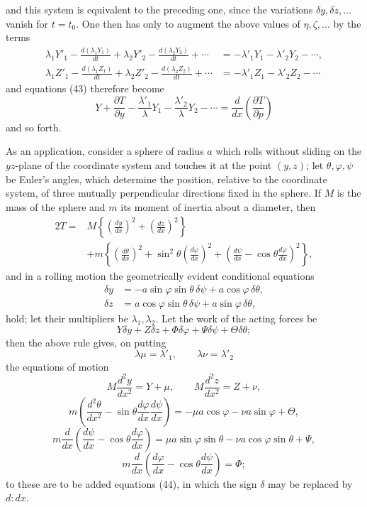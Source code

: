\documentclass[11pt,a4paper,leqno]{article}
\begin{document}
and this system is equivalent to the preceding one, since the variations $\delta y,\delta z,\ldots$ vanish for $t=t_0$. One then has only to augment the above values of $\eta,\zeta,\ldots$ by the terms
\[
\begin{aligned}
\lambda_1Y'_1-\frac{d(\lambda_1Y_1)}{dt}
+\lambda_2Y'_2-\frac{d(\lambda_2Y_2)}{dt}+\cdots
&=-\lambda'_1Y_1-\lambda'_2Y_2-\cdots,\\
\lambda_1Z'_1-\frac{d(\lambda_1Z_1)}{dt}
+\lambda_2Z'_2-\frac{d(\lambda_2Z_2)}{dt}+\cdots
&=-\lambda'_1Z_1-\lambda'_2Z_2-\cdots
\end{aligned}
\]
and equations (43) therefore become
\[
Y+\frac{\partial T}{\partial y}
-\frac{\lambda'_1}{\lambda}Y_1
-\frac{\lambda'_2}{\lambda}Y_2-\cdots
=\frac{d}{dx}\left(\frac{\partial T}{\partial p}\right)
\]
and so forth.

As an application, consider a sphere of radius $a$ which rolls without sliding on the $yz$-plane of the coordinate system and touches it at the point $(y,z)$; let $\theta,\varphi,\psi$ be Euler's angles, which determine the position, relative to the coordinate system, of three mutually perpendicular directions fixed in the sphere. If $M$ is the mass of the sphere and $m$ its moment of inertia about a diameter, then
\[
\begin{aligned}
2T={}&M\left\{\left(\frac{dy}{dx}\right)^2+\left(\frac{dz}{dx}\right)^2\right\}\\
&+m\left\{\left(\frac{d\theta}{dx}\right)^2
+\sin^2\theta\left(\frac{d\varphi}{dx}\right)^2
+\left(\frac{d\psi}{dx}-\cos\theta\frac{d\varphi}{dx}\right)^2\right\},
\end{aligned}
\]
and in a rolling motion the geometrically evident conditional equations
\begin{equation}\tag{44}
\begin{aligned}
\delta y&=-a\sin\varphi\sin\theta\,\delta\psi+a\cos\varphi\,\delta\theta,\\
\delta z&= a\cos\varphi\sin\theta\,\delta\psi+a\sin\varphi\,\delta\theta,
\end{aligned}
\end{equation}
hold; let their multipliers be $\lambda_1,\lambda_2$. Let the work of the acting forces be
\[
Y\delta y+Z\delta z+\Phi\delta\varphi+\Psi\delta\psi+\Theta\delta\theta;
\]
then the above rule gives, on putting
\[
\lambda\mu=\lambda'_1,\qquad \lambda\nu=\lambda'_2
\]
the equations of motion
\[
M\frac{d^2y}{dx^2}=Y+\mu,\qquad
M\frac{d^2z}{dx^2}=Z+\nu,
\]
\[
m\left(\frac{d^2\theta}{dx^2}-\sin\theta\frac{d\varphi}{dx}\frac{d\psi}{dx}\right)
=-\mu a\cos\varphi-\nu a\sin\varphi+\Theta,
\]
\[
m\frac{d}{dx}\left(\frac{d\psi}{dx}-\cos\theta\frac{d\varphi}{dx}\right)
=\mu a\sin\varphi\sin\theta-\nu a\cos\varphi\sin\theta+\Psi,
\]
\[
m\frac{d}{dx}\left(\frac{d\varphi}{dx}-\cos\theta\frac{d\psi}{dx}\right)=\Phi;
\]
to these are to be added equations (44), in which the sign $\delta$ may be replaced by $d:dx$.
\end{document}
